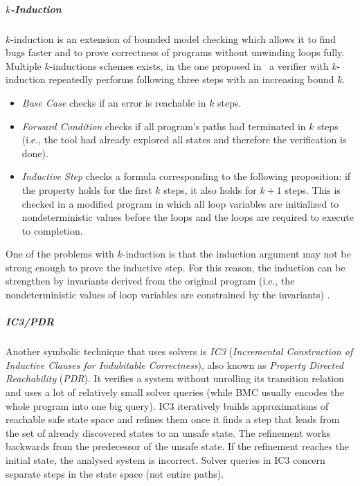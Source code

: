 \subparagraph{$k$-Induction}

$k$-induction  is an extension of
bounded model checking which allows it to find bugs faster and to prove
correctness of programs without unwinding loops fully.
Multiple $k$-inductions schemes exists, in the one proposed in~ a verifier with $k$-induction repeatedly performs following three steps with an increasing bound $k$.

\begin{itemize}
    \item \emph{Base Case} checks if an error is reachable in $k$ steps.
    \item \emph{Forward Condition} checks if all program's paths had terminated in
        $k$ steps (i.e., the tool had already explored all states and therefore
        the verification is done).
    \item \emph{Inductive Step} checks a formula corresponding to the following
        proposition: if the property holds for the first $k$ steps, it also
        holds for $k+1$ steps.
        This is checked in a modified program in which all loop variables are
        initialized to nondeterministic values before the loops and the loops
        are required to execute to completion.
\end{itemize}

One of the problems with $k$-induction is that the induction argument may not be strong enough to prove the inductive step.
For this reason, the induction can be strengthen by invariants derived from the original program (i.e., the nondeterministic values of loop variables are constrained by the invariants) .

\subparagraph{IC3/PDR}

Another symbolic technique that uses solvers is \emph{IC3} (\emph{Incremental Construction of Inductive Clauses for Indubitable Correctness}), also known as \emph{Property Directed Reachability} (\emph{PDR}).
It verifies a system without unrolling its transition relation and uses a lot of relatively small solver queries (while BMC usually encodes the whole program into one big query).
IC3 iteratively builds approximations of reachable safe state space and refines them once it finds a step that leads from the set of already discovered states to an unsafe state.
The refinement works backwards from the predecessor of the unsafe state.
If the refinement reaches the initial state, the analysed system is incorrect.
Solver queries in IC3 concern separate steps in the state space (not entire paths).

